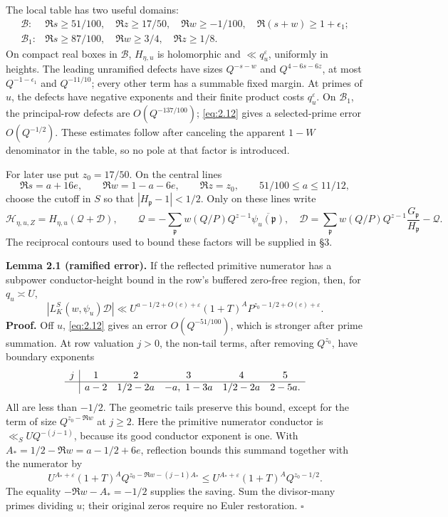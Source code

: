 \documentclass[11pt,a4paper]{article}
\begin{document}
The local table has two useful domains: \[
\begin{array}{ll}
 \mathcal B:&\Re s\ge51/100,\quad\Re z\ge17/50,\quad\Re w\ge-1/100,
                  \quad\Re(s+w)\ge1+\epsilon_1;\\
 \mathcal B_1:&\Re s\ge87/100,\quad\Re w\ge3/4,\quad\Re z\ge1/8.
\end{array}
\tag{2.13}\label{eq:2.13}
\] On compact real boxes in \(\mathcal B\), \(H_{\eta,u}\) is holomorphic and \(\ll q_u^\varepsilon\), uniformly in heights. The leading unramified defects have sizes \(Q^{-s-w}\) and \(Q^{4-6s-6z}\), at most \(Q^{-1-\epsilon_1}\) and \(Q^{-11/10}\); every other term has a summable fixed margin. At primes of \(u\), the defects have negative exponents and their finite product costs \(q_u^\varepsilon\). On \(\mathcal B_1\), the principal-row defects are \(O(Q^{-137/100})\); \eqref{eq:2.12} gives a selected-prime error \(O(Q^{-1/2})\). These estimates follow after canceling the apparent \(1-W\) denominator in the table, so no pole at that factor is introduced.

For later use put \(z_0=17/50\). On the central lines \[
 \Re s=a+16e,\qquad \Re w=1-a-6e,\qquad \Re z=z_0,
 \qquad 51/100\le a\le11/12,
\tag{2.14}\label{eq:2.14}
\] choose the cutoff in \(S\) so that \(|H_{\mathfrak p}-1|<1/2\). Only on these lines write \[
 \mathcal H_{\eta,u,Z}=H_{\eta,u}(\mathcal Q+\mathcal D),\qquad
 \mathcal Q=-\sum_{\mathfrak p}w(Q/P)Q^{z-1}\overline{\psi_u(\mathfrak p)},
\quad
 \mathcal D=\sum_{\mathfrak p}w(Q/P)Q^{z-1}\frac{G_{\mathfrak p}}{H_{\mathfrak p}}-\mathcal Q.
\tag{2.15}\label{eq:2.15}
\] The reciprocal contours used to bound these factors will be supplied in §3.

\textbf{Lemma 2.1 (ramified error).} If the reflected primitive numerator has a subpower conductor-height bound in the row's buffered zero-free region, then, for \(q_u\asymp U\), \[
 |L_K^S(w,\psi_u)\mathcal D|
 \ll U^{a-1/2+O(e)+\varepsilon}(1+T)^A P^{z_0-1/2+O(e)+\varepsilon}.
\tag{2.16}\label{eq:2.16}
\] \textbf{Proof.} Off \(u\), \eqref{eq:2.12} gives an error \(O(Q^{-51/100})\), which is stronger after prime summation. At row valuation \(j>0\), the non-tail terms, after removing \(Q^{z_0}\), have boundary exponents \[
\begin{array}{c|ccccc}
 j&1&2&3&4&5\\ \hline
 &a-2&1/2-2a&-a,\ 1-3a&1/2-2a&2-5a.
\end{array}
\] All are less than \(-1/2\). The geometric tails preserve this bound, except for the term of size \(Q^{z_0-\Re w}\) at \(j\ge2\). Here the primitive numerator conductor is \(\ll_S UQ^{-(j-1)}\), because its good conductor exponent is one. With \(A_*=1/2-\Re w=a-1/2+6e\), reflection bounds this summand together with the numerator by \[
 U^{A_*+\varepsilon}(1+T)^A
 Q^{z_0-\Re w-(j-1)A_*}
 \le U^{A_*+\varepsilon}(1+T)^A Q^{z_0-1/2}.
\] The equality \(-\Re w-A_*=-1/2\) supplies the saving. Sum the divisor-many primes dividing \(u\); their original zeros require no Euler restoration. \hfill\(\square\)
\end{document}
